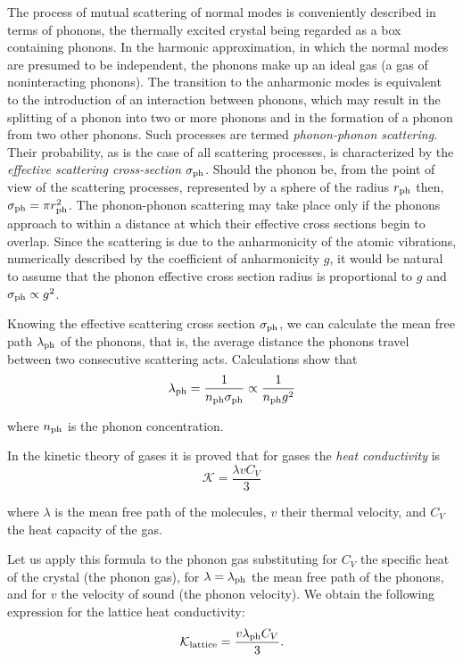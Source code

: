 The process of mutual scattering of normal modes is conveniently described in terms of phonons, the thermally excited crystal being regarded as a box containing phonons. In the harmonic approximation, in which the normal modes are presumed to be independent, the phonons make up an ideal gas (a gas of noninteracting phonons). The transition to the anharmonic modes is equivalent to the introduction of an interaction between phonons, which may result in the splitting of a phonon into two or more phonons and in the formation of a phonon from two other phonons. Such processes are termed \textit{phonon-phonon scattering}. Their probability, as is the case of all scattering processes, is characterized by the \textit{effective scattering cross-section} $\sigma_{\text{ph}}$. Should the phonon be, from the point of view of the scattering processes, represented by a sphere of the radius $r_{\text{ph}}$ then, $\sigma_{\text{ph}}=\pi r_{\text{ph}}^2$. The phonon-phonon scattering may take place only if the phonons approach to within a distance at which their effective cross sections begin to overlap. Since the scattering is due to the anharmonicity of the atomic vibrations, numerically described by the coefficient of anharmonicity $g$, it would be natural to assume that the phonon effective cross section radius is proportional to $g$ and $\sigma_{\text{ph}}\propto g^2$.

Knowing the effective scattering cross section $\sigma_{\text{ph}}$, we can calculate the mean free path $\lambda_{\text{ph}}$ of the phonons, that is, the average distance the phonons travel between two consecutive scattering acts. Calculations show that
\begin{equation}\label{eq:4_51}
    \lambda_{\text{ph}} = \frac{1}{n_{\text{ph}} \sigma_{\text{ph}}} \propto \frac{1}{n_{\text{ph}} g^2}
\end{equation}

\noindent
where $n_{\text{ph}}$ is the phonon concentration.

In the kinetic theory of gases it is proved that for gases the \textit{heat conductivity} is
\begin{equation}\label{eq:4_52}
    \mathcal{K} = \frac{\lambda v C_V}{3}
\end{equation}

\noindent
where $\lambda$ is the mean free path of the molecules, $v$ their thermal velocity, and $C_V$ the heat capacity of the gas.

Let us apply this formula to the phonon gas substituting for $C_V$ the specific heat of the crystal (the phonon gas), for $\lambda=\lambda_{\text{ph}}$ the mean free path of the phonons, and for $v$ the velocity of sound (the phonon velocity). We obtain the following expression for the lattice heat conductivity:
\begin{equation}\label{eq:4_53}
    \mathcal{K}_{\text{lattice}} = \frac{v \lambda_{\text{ph}} C_V}{3}.
\end{equation}

